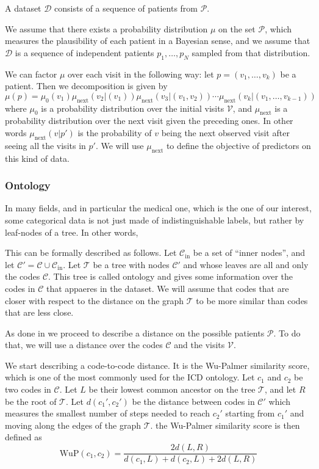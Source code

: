 \documentclass[]{marticle}
\newcommand{\ds}{\mathcal{D}}
\newcommand{\codes}{\mathcal{C}}
\newcommand{\codesin}{\mathcal{C}_\text{in}}
\newcommand{\tree }{\mathcal{T}}
\newcommand{\patients}{\mathcal{P}}
\newcommand{\visits}{\mathcal{V}}
\begin{document}
A dataset $\ds$ consists of a sequence of patients from $\patients$.

We assume that there exists a probability distribution $\mu$ on the set $\patients$, which measures
the plausibility of each patient in a Bayesian sense, and we assume that $\ds$ is a sequence of
independent patients $p_1, \dots, p_N$ sampled from that distribution.

We can factor $\mu$ over each visit in the following way: let $p=(v_1, \dots, v_k)$ be a patient. Then
we decomposition is given by
$$ \mu(p) = \mu_0(v_1) \mu_\text{next} (v_2 | (v_1)) \mu_\text{next} (v_3 |
    (v_1, v_2)) \cdots \mu_\text{next} (v_k | (v_1, \dots, v_{k-1})) $$
where $\mu_0$ is a probability distribution over the initial visits $\visits$, and $\mu_\text{next}$
is a probability distribution over the next visit given the preceding ones. In other words
$\mu_\text{next} (v | p')$ is the probability of $v$ being the next observed visit after seeing all
the visits in $p'$. We will use $\mu_\text{next}$ to define the objective of predictors on this kind
of data.

\subsubsection{Ontology} \label{sect-ontology}

In many fields, and in particular the medical one, which is the one of our interest, some
categorical data is not just made of indistinguishable labels, but rather by leaf-nodes of a tree.
In other words,

This can be formally described as follows. Let $\codesin$ be a set of ``inner nodes'', and let
$\codes' = \codes \cup \codesin$. Let $\tree$ be a tree with nodes $\codes'$ and whose leaves are
all and only the codes $\codes$. This tree is called ontology and gives some information over the
codes in $\codes$ that appaeres in the dataset. We will assume that codes that are closer with
respect to the distance on the graph $\tree$ to be more similar than codes that are less close.

As done in \cite{panigutti-xai} we proceed to describe a distance on the possible patients
$\patients$. To do that, we will use a distance over the codes $\codes$ and the visits $\visits$.

We start describing a code-to-code distance. It is the Wu-Palmer similarity score, which is one of
the most commonly used for the ICD ontology. Let $c_1$ and $c_2$ be two codes in $\codes$. Let $L$
be their lowest common ancestor on the tree $\tree$, and let $R$ be the root of $\tree$. Let
$d(c_1', c_2')$ be the distance between codes in $\codes'$ which measures the smallest number of
steps needed to reach $c_2'$ starting from $c_1'$ and moving along the edges of the graph $\tree$.
the Wu-Palmer similarity score is then defined as
\begin{equation*}
\text{WuP}(c_1, c_2) = \frac{2 d(L,R)}{d(c_1,L) + d(c_2, L) + 2d(L,R)}
\end{equation*}
\end{document}
